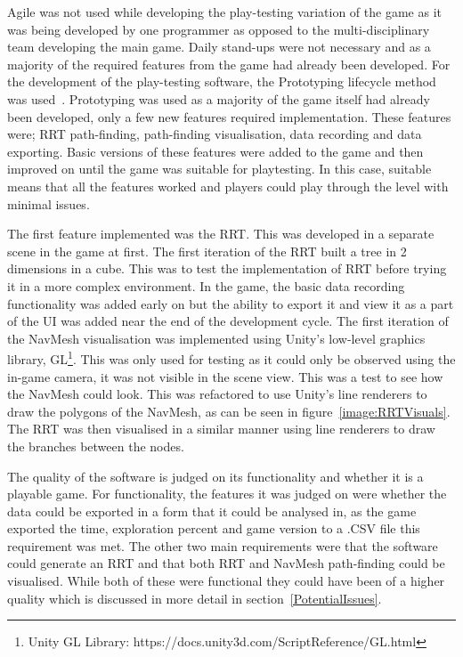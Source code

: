 \documentclass[journal]{IEEEtran}
\begin{document}
	Agile was not used while developing the play-testing variation of the game as it was being developed by one programmer as opposed to the multi-disciplinary team developing the main game. Daily stand-ups were not necessary and as a majority of the required features from the game had already been developed. 
	For the development of the play-testing software, the Prototyping lifecycle method was used~\cite{isaias2015}. Prototyping was used as a majority of the game itself had already been developed, only a few new features required implementation. These features were; RRT path-finding, path-finding visualisation, data recording and data exporting. Basic versions of these features were added to the game and then improved on until the game was suitable for playtesting. In this case, suitable means that all the features worked and players could play through the level with minimal issues.  
	
	The first feature implemented was the RRT. This was developed in a separate scene in the game at first. The first iteration of the RRT built a tree in 2 dimensions in a cube. This was to test the implementation of RRT before trying it in a more complex environment.  In the game, the basic data recording functionality was added early on but the ability to export it and view it as a part of the UI was added near the end of the development cycle. The first iteration of the NavMesh visualisation was implemented using Unity's low-level graphics library, GL\footnote[5]{Unity GL Library: https://docs.unity3d.com/ScriptReference/GL.html}. This was only used for testing as it could only be observed using the in-game camera,  it was not visible in the scene view. This was a test to see how the NavMesh could look. This was refactored to use Unity's line renderers to draw the polygons of the NavMesh, as can be seen in figure~\ref{image:RRTVisuals}. The RRT was then visualised in a similar manner using line renderers to draw the branches between the nodes.   
	
	The quality of the software is judged on its functionality and whether it is a playable game. For functionality, the features it was judged on were whether the data could be exported in a form that it could be analysed in, as the game exported the time, exploration percent and game version to a .CSV file this requirement was met. The other two main requirements were that the software could generate an RRT and that both RRT and NavMesh path-finding could be visualised. While both of these were functional they could have been of a higher quality which is discussed in more detail in section~\ref{PotentialIssues}.
	
\end{document}
